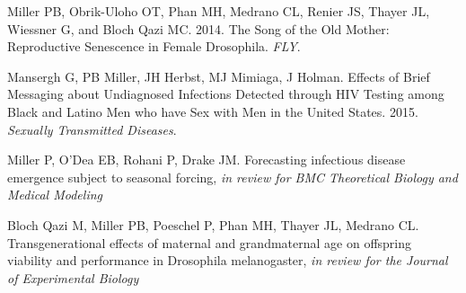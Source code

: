 \documentclass[letterpaper]{article}
\renewenvironment{itemize}{
  \begin{list}{}{
    \setlength{\leftmargin}{1.5em}
  }
}{
  \end{list}
}
\begin{document}
\begin{itemize}
\item Miller PB, Obrik-Uloho OT, Phan MH, Medrano CL, Renier JS, Thayer JL, Wiessner G, and Bloch Qazi MC. 2014. The Song of the Old Mother: Reproductive Senescence in Female Drosophila. \textit{FLY}.
\item Mansergh G, PB Miller, JH Herbst, MJ Mimiaga, J Holman. Effects of Brief Messaging about Undiagnosed Infections Detected through HIV Testing among Black and Latino Men who have Sex with Men in the United States. 2015. \textit{Sexually Transmitted Diseases}.
\item Miller P, O'Dea EB, Rohani P, Drake JM. Forecasting infectious disease emergence subject to seasonal forcing, \textit{in review for BMC Theoretical Biology and Medical Modeling}
\item Bloch Qazi M, Miller PB, Poeschel P, Phan MH, Thayer JL, Medrano CL. Transgenerational effects of maternal and grandmaternal age on offspring viability and performance in Drosophila melanogaster, \textit{in review for the Journal of Experimental Biology}

\end{itemize}
\end{document}
